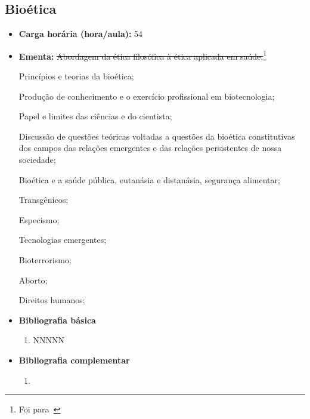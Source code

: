 \documentclass[11pt,fleqn]{book} %
\begin{document}
\subsection{Bioética}\label{disc:bioetica}
\begin{itemize}
	\item \textbf{Carga horária (hora/aula):} 54
	\item \textbf{Ementa:} 
	\sout{Abordagem da ética filosófica à ética aplicada em saúde;}\footnote{Foi para~}
	
	Princípios e teorias da bioética;
	
	Produção de conhecimento e o exercício profissional em biotecnologia; 
	
	Papel e limites das ciências e do cientista; 
	
	Discussão de questões teóricas voltadas a questões da bioética constitutivas dos campos das relações emergentes e das relações persistentes de nossa sociedade; 
	
	Bioética e a saúde pública, eutanásia e distanásia, segurança alimentar; 
	
	Transgênicos; 
	
	Especismo; 
	
	Tecnologias emergentes;
	
	Bioterrorismo; 
	
	Aborto;
	
	Direitos humanos;
	\item \textbf{Bibliografia básica}
	\begin{enumerate}
		\item NNNNN
	\end{enumerate}
	\item \textbf{Bibliografia complementar}
	\begin{enumerate}
		\item 
	\end{enumerate}	
\end{itemize}

\newpage
\end{document}
